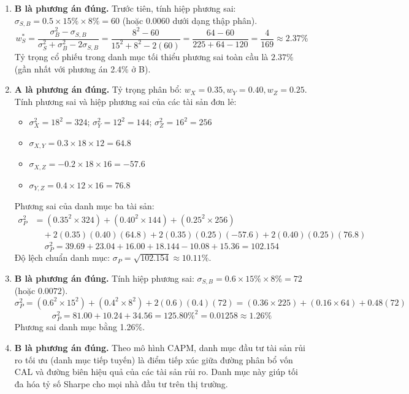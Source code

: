 \begin{enumerate}
	\item \textbf{B là phương án đúng.} 
	      Trước tiên, tính hiệp phương sai: $\sigma_{S,B} = 0.5 \times 15\% \times 8\% = 60$ (hoặc $0.0060$ dưới dạng thập phân).
	      \[
	      w_S^* = \frac{\sigma_B^2 - \sigma_{S,B}}{\sigma_S^2 + \sigma_B^2 - 2\sigma_{S,B}} = \frac{8^2 - 60}{15^2 + 8^2 - 2(60)} = \frac{64 - 60}{225 + 64 - 120} = \frac{4}{169} \approx 2.37\%
	      \]
	      Tỷ trọng cổ phiếu trong danh mục tối thiểu phương sai toàn cầu là $2.37\%$ (gần nhất với phương án 2.4\% ở B).
	      
	\item \textbf{A là phương án đúng.} 
	      Tỷ trọng phân bổ: $w_X = 0.35, w_Y = 0.40, w_Z = 0.25$.
	      Tính phương sai và hiệp phương sai của các tài sản đơn lẻ:
	      \begin{itemize}
		      \item $\sigma_X^2 = 18^2 = 324$; $\sigma_Y^2 = 12^2 = 144$; $\sigma_Z^2 = 16^2 = 256$
		      \item $\sigma_{X,Y} = 0.3 \times 18 \times 12 = 64.8$
		      \item $\sigma_{X,Z} = -0.2 \times 18 \times 16 = -57.6$
		      \item $\sigma_{Y,Z} = 0.4 \times 12 \times 16 = 76.8$
	      \end{itemize}
	      Phương sai của danh mục ba tài sản:
	      \[
	      \begin{aligned}
		      \sigma_P^2 &= (0.35^2 \times 324) + (0.40^2 \times 144) + (0.25^2 \times 256) \\
		      &\quad + 2(0.35)(0.40)(64.8) + 2(0.35)(0.25)(-57.6) + 2(0.40)(0.25)(76.8)
	      \end{aligned}
	      \]
	      \[
	      \sigma_P^2 = 39.69 + 23.04 + 16.00 + 18.144 - 10.08 + 15.36 = 102.154
	      \]
	      Độ lệch chuẩn danh mục: $\sigma_P = \sqrt{102.154} \approx 10.11\%$.
	      
	\item \textbf{B là phương án đúng.} 
	      Tính hiệp phương sai: $\sigma_{S,B} = 0.6 \times 15\% \times 8\% = 72$ (hoặc $0.0072$).
	      \[
	      \sigma_P^2 = (0.6^2 \times 15^2) + (0.4^2 \times 8^2) + 2(0.6)(0.4)(72) = (0.36 \times 225) + (0.16 \times 64) + 0.48(72)
	      \]
	      \[
	      \sigma_P^2 = 81.00 + 10.24 + 34.56 = 125.80\%^2 = 0.01258 \approx 1.26\%
	      \]
	      Phương sai danh mục bằng 1.26\%.
	      
	\item \textbf{B là phương án đúng.} Theo mô hình CAPM, danh mục đầu tư tài sản rủi ro tối ưu (danh mục tiếp tuyến) là điểm tiếp xúc giữa đường phân bổ vốn CAL và đường biên hiệu quả của các tài sản rủi ro. Danh mục này giúp tối đa hóa tỷ số Sharpe cho mọi nhà đầu tư trên thị trường.
\end{enumerate}

